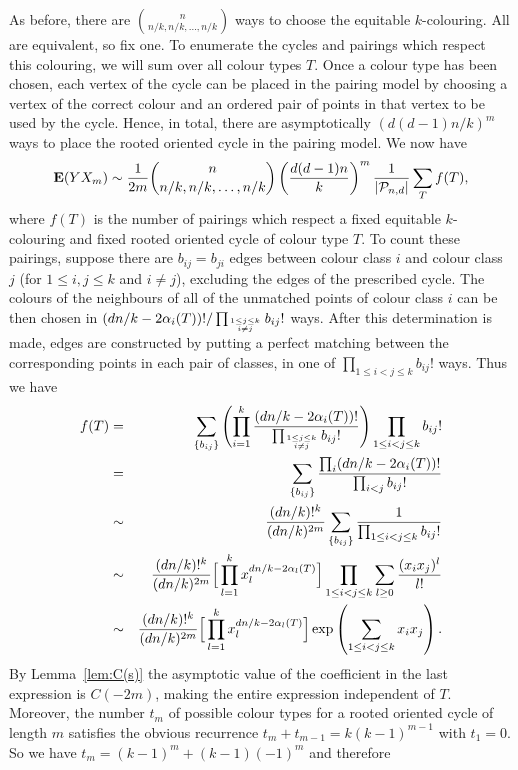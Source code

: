 \documentclass[12pt]{article}
\def\P{{\cal P}}
\def\ex{{\bf E}}
\def\Pnd{\P_{n,d}}
\begin{document}
As before, there are $\binom{n}{n/k, n/k, \ldots, n/k}$ ways to choose
the equitable $k$-colouring. All are equivalent, so fix one. To enumerate the
cycles and pairings which respect this colouring, we will sum over all colour
types $T$. Once a colour type has been chosen, each vertex of the
cycle can be placed
in the pairing model by choosing a vertex of the correct colour and
an ordered pair of
points in that vertex to be used by the cycle. Hence, in total, there
are asymptotically
$\left( d(d-1)n/k\right)^m$ ways to place the rooted oriented cycle
in the pairing model. We now have
$$
\ex (YX_m) \sim
\frac{1}{2m}
\binom{n}{n/k, n/k, \ldots, n/k}
\left(\frac{ d(d-1)n}{k}\right)^m
\frac{1}{\left| \Pnd \right|}
\sum_T f(T),
$$
where $f(T)$ is the number of pairings which respect a fixed equitable 
$k$-colouring and
fixed rooted oriented cycle of colour type $T$.
To count these pairings, suppose there are $b_{ij}=b_{ji}$ edges between
colour class $i$ and colour class $j$ (for $1\le i, j\le k$ and $i\ne j$), excluding the edges
of the prescribed cycle. The colours of the
neighbours of all of the unmatched points of colour class $i$
can be then chosen in
$(dn/k - 2\alpha_i(T))!/\prod_{1\le j\le k\atop i\ne j} b_{ij}!$ ways. 
After this determination
is made, edges are constructed by putting a perfect matching between
the corresponding points in each pair of classes, in one of 
$\prod_{1\le i<j\le k}b_{ij}!$
ways. Thus we have
\begin{eqnarray*}
f(T) &=&
\sum_{\{b_{ij}\}}
\left( \prod_{i=1}^k \frac{(dn/k - 2\alpha_i(T))!}{\prod_{1\le j\le k\atop i\ne j} b_{ij}!} \right)
\prod_{1\le i<j\le k}b_{ij}! \\
&=&
\sum_{\{b_{ij}\}}
\frac{\prod_i(dn/k - 2\alpha_i(T))!}{\prod_{i<j}b_{ij}!} \\
&\sim&
\frac{(dn/k)!^k}{(dn/k)^{2m}}
\sum_{\{b_{ij}\}}
\frac{1}{\prod_{1\le i<j\le k}b_{ij}!} \\
&\sim&
\frac{(dn/k)!^k}{(dn/k)^{2m}}
\Big[\prod_{l=1}^k x_l^{dn/k-2\alpha_l(T)}\Big] \prod_{1\le i<j\le k}\sum_{l\geq 0} 
\frac{(x_i x_j)^l}{l!} \\
&\sim&
\frac{(dn/k)!^k}{(dn/k)^{2m}}
\Big[\prod_{l=1}^k x_l^{dn/k-2\alpha_l(T)}\Big] \exp\left(\sum_{1\le i<j\le k} x_i x_j\right).
\end{eqnarray*}
By Lemma~\ref{lem:C(s)} the asymptotic value of the coefficient in the
last expression is $C(-2m)$, making the entire expression independent 
of $T$.
Moreover, the number $t_m$ of possible colour types for a rooted oriented cycle of length $m$ satisfies the obvious recurrence $t_m + t_{m-1} = k(k-1)^{m-1}$ with $t_1=0$. So we have $t_m=(k-1)^m + (k-1)(-1)^m$ and therefore
\end{document}
